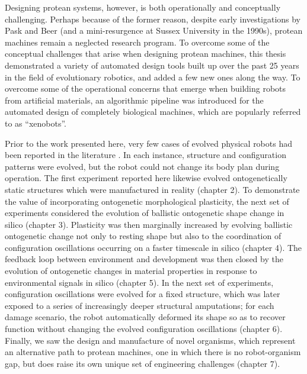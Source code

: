 Designing protean systems, however, is both operationally and conceptually challenging.
Perhaps because of the former reason, despite early investigations by Pask and Beer (and a mini-resurgence 
at Sussex University in the 1990s), protean machines remain a neglected research program.
To overcome some of the conceptual challenges that arise when designing protean machines,
this thesis demonstrated
a variety of automated design tools built up over the past 25 years in the field of evolutionary robotics, and added a few new ones along the way.
To overcome some of the operational concerns that emerge when building robots from artificial materials, 
an algorithmic pipeline was introduced for the 
automated design of completely biological machines,
which are popularly referred to as ``xenobots''.


Prior to the work presented here,
very few cases of evolved physical robots had been reported in the literature
\cite{hornby2003generative,paul2006design,hiller2012automatic,faina2013edhmor,brodbeck2015morphological,cellucci20171d}.
In each instance, structure and configuration patterns were evolved, but the robot could not change its body plan during operation.
The first experiment reported here likewise evolved ontogenetically static structures which were manufactured in reality (chapter 2).
To demonstrate 
the value of incorporating ontogenetic morphological plasticity,
the next set of experiments considered
the evolution of ballistic ontogenetic shape change in silico (chapter 3).
Plasticity was then marginally increased by
evolving ballistic ontogenetic change not only to resting shape but also to the coordination of configuration oscillations occurring on a faster timescale in silico (chapter 4).
The feedback loop between environment and development was then closed by
the evolution of ontogenetic changes in material properties in response to environmental signals in silico (chapter 5).
In the next set of experiments,
configuration oscillations were evolved for a fixed structure,
which was later exposed to a series of 
increasingly deeper structural amputations;
for each damage scenario, the robot automatically deformed its shape so as to recover function without changing the evolved configuration oscillations (chapter 6).
Finally, we saw the design and manufacture of novel organisms, which represent an alternative path to protean machines, one in which there is no robot-organism gap, but does raise its own unique set of engineering challenges (chapter 7).

